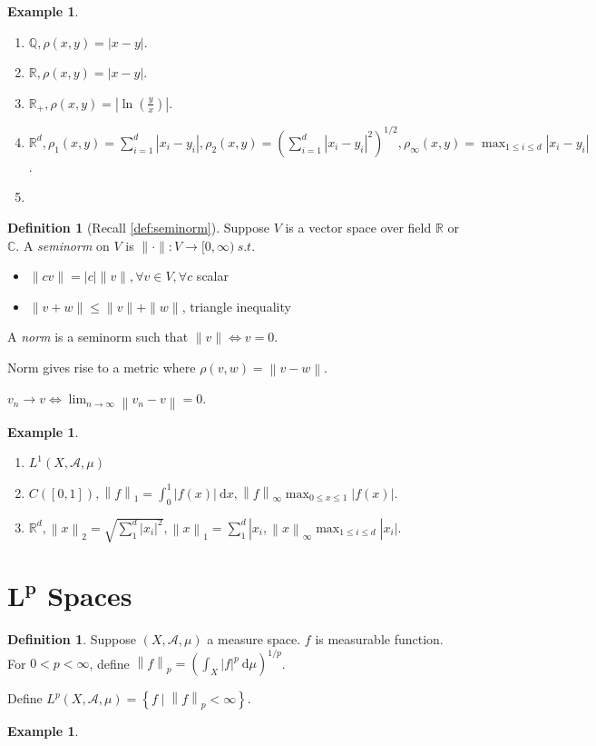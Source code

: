 \documentclass{report}
\newcommand{\R}{\mathbb{R}}
\newcommand{\C}{\mathbb{C}}
\newcommand{\Q}{\mathbb{Q}}
\newcommand{\st}{\ s.t.\ }
\newcommand{\cA}{\mathcal{A}}
\newcommand{\df}{\ \mathrm{d}}
\newcommand{\norm}[1]{\left\| #1 \right\|}
\theoremstyle{definition}
\newtheorem{definition}[theorem]{Definition}
\newtheorem{example}[theorem]{Example}
\theoremstyle{remark}
\newcommand{\fnl}{\parbox[t]{0\linewidth}{}}
\newcommand*\ttlmath[2]{\texorpdfstring{$\boldsymbol{#1}$}{#2}}
\begin{document}
\begin{example}\fnl
	\begin{enumerate}
		\item $\Q, \rho(x, y) = |x - y|$. 
		\item $\R, \rho(x, y) = |x - y|$.
		\item $\displaystyle \R_+, \rho(x, y) = \left| \ln \left(\frac{y}{x}\right) \right|$.
		\item $\displaystyle \R^d, \rho_1(x, y) = \sum_{i=1}^d |x_i - y_i|, \rho_2(x, y) = \left(\sum_{i=1}^d |x_i - y_i|^2\right)^{1/2}, \rho_\infty(x, y) = \max_{1 \leq i \leq d} |x_i - y_i|$.
		\item 
	\end{enumerate}
\end{example}

\begin{definition}[Recall \ref{def:seminorm}]
	Suppose $V$ is a vector space over field $\R$ or $\C$. A \emph{seminorm}
	on $V$ is $\|\cdot\|: V \to [0, \infty) \st$
	\begin{itemize}
	\item $\|cv\| = |c|\|v\|, \forall v \in V, \forall c$ scalar
	\item $\|v + w\| \leq \|v\| + \|w\|$, triangle inequality
	\end{itemize}
	A \emph{norm} is a seminorm such that $\|v\| \iff v = 0$.
\end{definition}

Norm gives rise to a metric where $\rho(v, w) = \norm{v - w}$.

$v_n \to v \iff \lim_{n \to \infty}\norm{v_n - v} = 0$.

\begin{example}
	\begin{enumerate}
		\item $L^1(X, \cA, \mu)$
		\item $C([0, 1]), \norm{f}_1 = \int_0^1 |f(x)|\df x, \norm{f}_\infty \max_{0 \leq x \leq 1} |f(x)|$.
		\item $\R^d, \norm{x}_2 = \sqrt{\sum_{1}^d |x_i|^2}, \norm{x}_1 = \sum_{1}^d|x_i, \norm{x}_\infty \max_{1 \leq i \leq d} |x_i|$.
	\end{enumerate}
\end{example}

\section{\ttlmath{L^p}{L\^p} Spaces}
\begin{definition}
	Suppose $(X, \cA, \mu)$ a measure space. $f$ is measurable function. For $0 < p < \infty$, define $\norm{f}_p = \left(\int_{X} |f|^p \df \mu\right)^{1/p}$.

	Define $L^p(X, \cA, \mu) = \left\lbrace f \mid \norm{f}_p < \infty\right\rbrace$.
\end{definition}
\begin{example}
	
\end{example}
\end{document}

